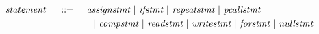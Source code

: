 \[ \begin{aligned}
	~\emph{statement}~ \quad ::= \quad
		& ~\emph{assignstmt}~ | ~\emph{ifstmt}~ | ~\emph{repeatstmt}~ | ~\emph{pcallstmt}~ \\
		& \quad | ~\emph{compstmt}~ | ~\emph{readstmt}~ | ~\emph{writestmt}~ | ~\emph{forstmt}~ | ~\emph{nullstmt}~
\end{aligned} \]
